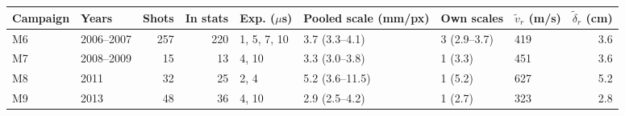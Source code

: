 \setlength{\tabcolsep}{4pt}\begin{tabular}{llrrllllr}
\toprule
Campaign & Years & Shots & In stats & Exp. ($\mu$s) & Pooled scale (mm/px) & Own scales & $\tilde v_r$ (m/s) & $\tilde\delta_r$ (cm) \\
\midrule
M6 & 2006--2007 & 257 & 220 & 1, 5, 7, 10 & 3.7 (3.3--4.1) & 3 (2.9--3.7) & 419 & 3.6 \\
M7 & 2008--2009 & 15 & 13 & 4, 10 & 3.3 (3.0--3.8) & 1 (3.3) & 451 & 3.6 \\
M8 & 2011 & 32 & 25 & 2, 4 & 5.2 (3.6--11.5) & 1 (5.2) & 627 & 5.2 \\
M9 & 2013 & 48 & 36 & 4, 10 & 2.9 (2.5--4.2) & 1 (2.7) & 323 & 2.8 \\
\bottomrule
\end{tabular}
